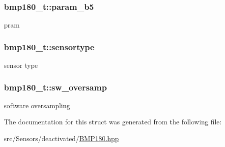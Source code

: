 \subsubsection[{\texorpdfstring{param\+\_\+b5}{param_b5}}]{ bmp180\+\_\+t\+::param\+\_\+b5}\hypertarget{structbmp180__t_ae753cf9c8d8f28a1b3395c472acb61fb}{}\label{structbmp180__t_ae753cf9c8d8f28a1b3395c472acb61fb}
pram 
\subsubsection[{\texorpdfstring{sensortype}{sensortype}}]{ bmp180\+\_\+t\+::sensortype}\hypertarget{structbmp180__t_a9b9ced8e0fdb8fb0ab04a875e4d46f38}{}\label{structbmp180__t_a9b9ced8e0fdb8fb0ab04a875e4d46f38}
sensor type 
\subsubsection[{\texorpdfstring{sw\+\_\+oversamp}{sw_oversamp}}]{ bmp180\+\_\+t\+::sw\+\_\+oversamp}\hypertarget{structbmp180__t_a0bda5ec8f08249ee69f2e4a14df59f6e}{}\label{structbmp180__t_a0bda5ec8f08249ee69f2e4a14df59f6e}
software oversampling 

The documentation for this struct was generated from the following file\+:\begin{DoxyCompactItemize}
\item 
src/\+Sensors/deactivated/\hyperlink{BMP180_8hpp}{B\+M\+P180.\+hpp}\end{DoxyCompactItemize}
